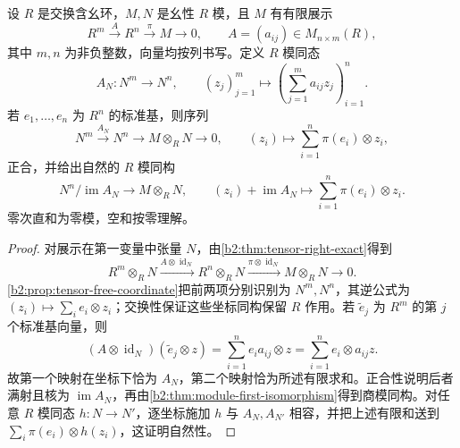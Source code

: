 \begin{corollary}\label{b2:cor:tensor-finite-presentation}
	设 \(R\) 是交换含幺环，\(M,N\) 是幺性 \(R\) 模，且 \(M\) 有有限展示
	\[
		R^m\xrightarrow{A}R^n\xrightarrow{\pi}M\longrightarrow0, \qquad A=(a_{ij})\in M_{n\times m}(R),
	\]
	其中 \(m,n\) 为非负整数，向量均按列书写。定义 \(R\) 模同态
	\[
		A_N:N^m\longrightarrow N^n,\qquad (z_j)_{j=1}^m\longmapsto \left(\sum_{j=1}^m a_{ij}z_j\right)_{i=1}^n.
	\]
	若 \(e_1,\ldots,e_n\) 为 \(R^n\) 的标准基，则序列
	\[
		N^m\xrightarrow{A_N}N^n\longrightarrow M\otimes_RN\longrightarrow0, \qquad (z_i)\longmapsto\sum_{i=1}^n\pi(e_i)\otimes z_i,
	\]
	正合，并给出自然的 \(R\) 模同构
	\[
		N^n/\operatorname{im}A_N\longrightarrow M\otimes_RN, \qquad (z_i)+\operatorname{im}A_N\longmapsto \sum_{i=1}^n\pi(e_i)\otimes z_i.
	\]
	零次直和为零模，空和按零理解。
\end{corollary}
\begin{proof}
	对展示在第一变量中张量 \(N\)，由\cref{b2:thm:tensor-right-exact}得到
	\[
		R^m\otimes_RN\xrightarrow{A\otimes\operatorname{id}_N} R^n\otimes_RN\xrightarrow{\pi\otimes\operatorname{id}_N} M\otimes_RN\longrightarrow0.
	\]
	\cref{b2:prop:tensor-free-coordinate}把前两项分别识别为 \(N^m,N^n\)，其逆公式为 \((z_i)\mapsto\sum_i e_i\otimes z_i\)；交换性保证这些坐标同构保留 \(R\) 作用。若 \(\widetilde e_j\) 为 \(R^m\) 的第 \(j\) 个标准基向量，则
	\[
		(A\otimes\operatorname{id}_N)(\widetilde e_j\otimes z) =\sum_{i=1}^n e_i a_{ij}\otimes z =\sum_{i=1}^n e_i\otimes a_{ij}z.
	\]
	故第一个映射在坐标下恰为 \(A_N\)，第二个映射恰为所述有限求和。正合性说明后者满射且核为 \(\operatorname{im}A_N\)，再由\cref{b2:thm:module-first-isomorphism}得到商模同构。对任意 \(R\) 模同态 \(h:N\to N'\)，逐坐标施加 \(h\) 与 \(A_N,A_{N'}\) 相容，并把上述有限和送到 \(\sum_i\pi(e_i)\otimes h(z_i)\)，这证明自然性。
\end{proof}
